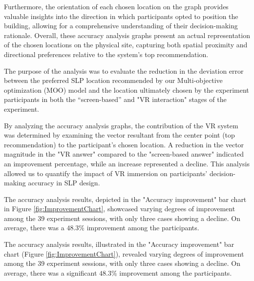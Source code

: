 Furthermore, the orientation of each chosen location on the graph provides valuable insights into the direction in which participants opted to position the building, allowing for a comprehensive understanding of their decision-making rationale.
Overall, these accuracy analysis graphs present an actual representation of the chosen locations on the physical site, capturing both spatial proximity and directional preferences relative to the system's top recommendation.

The purpose of the analysis was to evaluate the reduction in the deviation error between the preferred SLP location recommended by our Multi-objective optimization (MOO) model and the location ultimately chosen by the experiment participants in both the ``screen-based'' and "VR interaction" stages of the experiment.

By analyzing the accuracy analysis graphs, the contribution of the VR system was determined by examining the vector resultant from the center point (top recommendation) to the participant's chosen location.
A reduction in the vector magnitude in the "VR answer" compared to the "screen-based answer" indicated an improvement percentage, while an increase represented a decline.
This analysis allowed us to quantify the impact of VR immersion on participants' decision-making accuracy in SLP design.

The accuracy analysis results, depicted in the "Accuracy improvement" bar chart in Figure \ref{fig:ImprovementChart}, showcased varying degrees of improvement among the 39 experiment sessions, with only three cases showing a decline.
On average, there was a \(48.3\%\) improvement among the participants.

The accuracy analysis results, illustrated in the "Accuracy improvement" bar chart (Figure \ref{fig:ImprovementChart}), revealed varying degrees of improvement among the 39 experiment sessions, with only three cases showing a decline.
On average, there was a significant \(48.3\%\) improvement among the participants.

